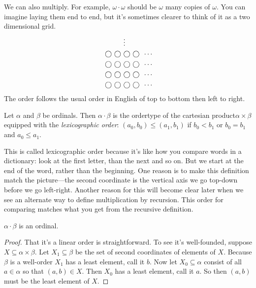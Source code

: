 \documentclass[10pt]{amsart}
\begin{document}
We can also multiply. For example, $\omega \cdot \omega$ should be $\omega$ many copies of $\omega$. You can imagine laying them end to end, but it's sometimes clearer to think of it as a two dimensional grid.
\begin{align*}
&\vdots \\
\mathord{\,\bigcirc\,} \mathord{\,\bigcirc\,} &\mathord{\,\bigcirc\,} \mathord{\,\bigcirc\,} \ \cdots \\
\mathord{\,\bigcirc\,} \mathord{\,\bigcirc\,} &\mathord{\,\bigcirc\,} \mathord{\,\bigcirc\,} \ \cdots \\
\mathord{\,\bigcirc\,} \mathord{\,\bigcirc\,} &\mathord{\,\bigcirc\,} \mathord{\,\bigcirc\,} \ \cdots \\
\mathord{\,\bigcirc\,} \mathord{\,\bigcirc\,} &\mathord{\,\bigcirc\,} \mathord{\,\bigcirc\,} \ \cdots \\
\end{align*}
The order follows the usual order in English of top to bottom then left to right.

\begin{definition}
Let $\alpha$ and $\beta$ be ordinals. Then $\alpha \cdot \beta$ is the ordertype of the cartesian product$\alpha \times \beta$ equipped with the \emph{lexicographic order}: $(a_0,b_0) \le (a_1,b_1)$ if $b_0 < b_1$ or $b_0 = b_1$ and $a_0 \le a_1$.
\end{definition}

This is called lexicographic order because it's like how you compare words in a dictionary: look at the first letter, than the next and so on. But we start at the end of the word, rather than the beginning. One reason is to make this definition match the picture---the second coordinate is the vertical axis we go top-down before we go left-right. Another reason for this will become clear later when we see an alternate way to define multiplication by recursion. This order for comparing matches what you get from the recursive definition.

\begin{proposition}
$\alpha \cdot \beta$ is an ordinal.
\end{proposition}

\begin{proof}
That it's a linear order is straightforward. To see it's well-founded, suppose $X \subseteq \alpha \times \beta$. Let $X_1 \subseteq \beta$ be the set of second coordinates of elements of $X$. Because $\beta$ is a well-order $X_1$ has a least element, call it $b$. Now let $X_0 \subseteq \alpha$ consist of all $a \in \alpha$ so that $(a,b) \in X$. Then $X_0$ has a least element, call it $a$. So then $(a,b)$ must be the least element of $X$.
\end{proof}
\end{document}
